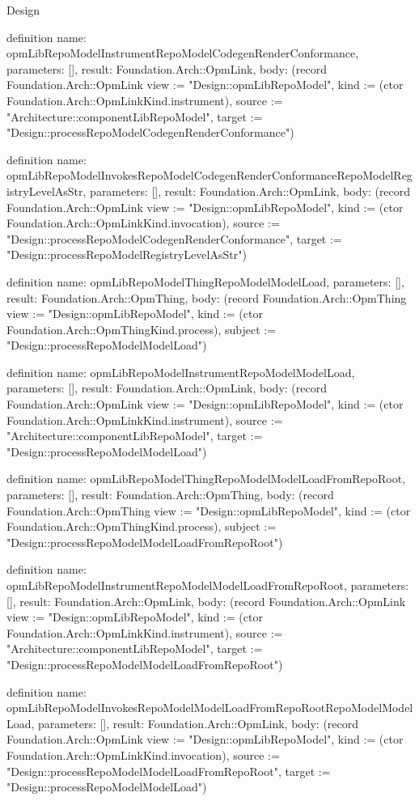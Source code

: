 \begin{lexlean}{Design}
\begin{semanticmodule}
definition{
  name: opmLibRepoModelInstrumentRepoModelCodegenRenderConformance,
  parameters: [],
  result: Foundation.Arch::OpmLink,
  body: (record Foundation.Arch::OpmLink {view := "Design::opmLibRepoModel", kind := (ctor Foundation.Arch::OpmLinkKind.instrument), source := "Architecture::componentLibRepoModel", target := "Design::processRepoModelCodegenRenderConformance"})
}

definition{
  name: opmLibRepoModelInvokesRepoModelCodegenRenderConformanceRepoModelRegistryLevelAsStr,
  parameters: [],
  result: Foundation.Arch::OpmLink,
  body: (record Foundation.Arch::OpmLink {view := "Design::opmLibRepoModel", kind := (ctor Foundation.Arch::OpmLinkKind.invocation), source := "Design::processRepoModelCodegenRenderConformance", target := "Design::processRepoModelRegistryLevelAsStr"})
}

definition{
  name: opmLibRepoModelThingRepoModelModelLoad,
  parameters: [],
  result: Foundation.Arch::OpmThing,
  body: (record Foundation.Arch::OpmThing {view := "Design::opmLibRepoModel", kind := (ctor Foundation.Arch::OpmThingKind.process), subject := "Design::processRepoModelModelLoad"})
}

definition{
  name: opmLibRepoModelInstrumentRepoModelModelLoad,
  parameters: [],
  result: Foundation.Arch::OpmLink,
  body: (record Foundation.Arch::OpmLink {view := "Design::opmLibRepoModel", kind := (ctor Foundation.Arch::OpmLinkKind.instrument), source := "Architecture::componentLibRepoModel", target := "Design::processRepoModelModelLoad"})
}

definition{
  name: opmLibRepoModelThingRepoModelModelLoadFromRepoRoot,
  parameters: [],
  result: Foundation.Arch::OpmThing,
  body: (record Foundation.Arch::OpmThing {view := "Design::opmLibRepoModel", kind := (ctor Foundation.Arch::OpmThingKind.process), subject := "Design::processRepoModelModelLoadFromRepoRoot"})
}

definition{
  name: opmLibRepoModelInstrumentRepoModelModelLoadFromRepoRoot,
  parameters: [],
  result: Foundation.Arch::OpmLink,
  body: (record Foundation.Arch::OpmLink {view := "Design::opmLibRepoModel", kind := (ctor Foundation.Arch::OpmLinkKind.instrument), source := "Architecture::componentLibRepoModel", target := "Design::processRepoModelModelLoadFromRepoRoot"})
}

definition{
  name: opmLibRepoModelInvokesRepoModelModelLoadFromRepoRootRepoModelModelLoad,
  parameters: [],
  result: Foundation.Arch::OpmLink,
  body: (record Foundation.Arch::OpmLink {view := "Design::opmLibRepoModel", kind := (ctor Foundation.Arch::OpmLinkKind.invocation), source := "Design::processRepoModelModelLoadFromRepoRoot", target := "Design::processRepoModelModelLoad"})
}


\end{semanticmodule}
\end{lexlean}
